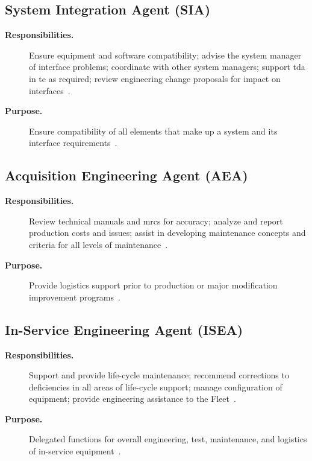 \documentclass[../main.tex]{subfiles}
\begin{document}
\subsection{System Integration Agent (SIA)}
\begin{description}
  \item[\textbf{Responsibilities.}] Ensure equipment and software compatibility; advise the system manager of interface problems; coordinate with other system managers; support \ac{tda} in \ac{te} as required; review engineering change proposals for impact on interfaces~\autocite{edo-2-1-5-technical-authority-2025}.
  \item[\textbf{Purpose.}] Ensure compatibility of all elements that make up a system and its interface requirements~\autocite{edo-2-1-5-technical-authority-2025}.
\end{description}

\subsection{Acquisition Engineering Agent (AEA)}
\begin{description}
  \item[\textbf{Responsibilities.}] Review technical manuals and \acp{mrc} for accuracy; analyze and report production costs and issues; assist in developing maintenance concepts and criteria for all levels of maintenance~\autocite{edo-2-1-5-technical-authority-2025}.
  \item[\textbf{Purpose.}] Provide logistics support prior to production or major modification improvement programs~\autocite{edo-2-1-5-technical-authority-2025}.
\end{description}

\subsection{In-Service Engineering Agent (ISEA)}
\begin{description}
  \item[\textbf{Responsibilities.}] Support and provide life-cycle maintenance; recommend corrections to deficiencies in all areas of life-cycle support; manage configuration of equipment; provide engineering assistance to the Fleet~\autocite{edo-2-1-5-technical-authority-2025}.
  \item[\textbf{Purpose.}] Delegated functions for overall engineering, test, maintenance, and logistics of in-service equipment~\autocite{edo-2-1-5-technical-authority-2025}.
\end{description}
\end{document}
